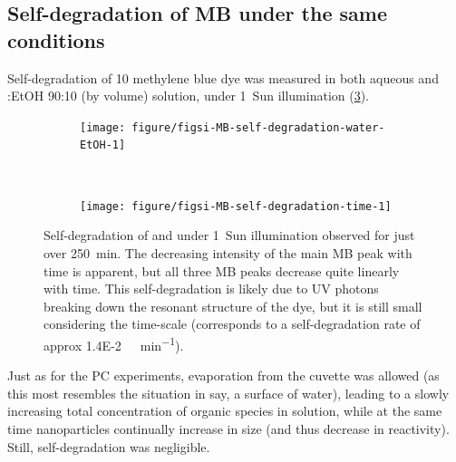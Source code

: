 \documentclass[9pt,twoside,twocolumn]{article}\usepackage{knitr}
\begin{document}
\begin{refsection}
\subsection*{Self-degradation of MB under the same conditions}

Self-degradation of \qty{10}{\micromolar} methylene blue dye was measured in both aqueous and :EtOH 90:10 (by volume) solution, under 1~Sun illumination (\cref{figsi:MB-self-degradation-spectra}).

\begin{figure}[tbh]
\centering
\begin{subfigure}[b]{\linewidth}
\caption{}
\label{figsi:MB-self-degradation-water-EtOH}
\begin{knitrout}\footnotesize
{}\color{fgcolor}

{\centering \texttt{[image: figure/figsi-MB-self-degradation-water-EtOH-1]} 

}


\end{knitrout}
\end{subfigure}\\
\begin{subfigure}[b]{\linewidth}
\caption{}
\label{figsi:MB-self-degradation-time}
\begin{knitrout}\footnotesize
{}\color{fgcolor}

{\centering \texttt{[image: figure/figsi-MB-self-degradation-time-1]} 

}


\end{knitrout}
\end{subfigure}
\caption{Self-degradation of  and  under 1~Sun illumination observed for just over \qty{250}{\minute}. The decreasing intensity of the main MB peak with time is apparent, but all three MB peaks decrease quite linearly with time.
This self-degradation is likely due to UV photons breaking down the resonant structure of the dye, but it is still small considering the time-scale (corresponds to a self-degradation rate of approx \qty{1.4E-2}{\micro\molar\per\minute}).}
\label{figsi:MB-self-degradation-spectra}
\end{figure}


Just as for the PC experiments, evaporation from the cuvette was allowed (as this most resembles the situation in say, a surface of water), leading to a slowly increasing total concentration of organic species in solution, while at the same time nanoparticles continually increase in size (and thus decrease in reactivity). Still, self-degradation was negligible.


\end{refsection}
\end{document}
